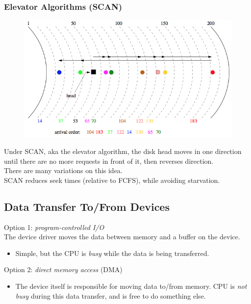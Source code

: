 \documentclass[12pt]{article}
\theoremstyle{plain}
\theoremstyle{definition}
\begin{document}
\subsubsection{Elevator Algorithms (SCAN)}
\begin{figure}[H]
  \centering
  \includegraphics[scale=0.5]{pictures/scan_disk.png}
\end{figure}
Under SCAN, aka the elevator algorithm, the disk head moves in one direction until there are no more requests in front of it, then reverses direction. \\
There are many variations on this idea. \\

SCAN reduces seek times (relative to FCFS), while avoiding starvation.

\subsection{Data Transfer To/From Devices}
Option 1: \emph{program-controlled I/O} \\
The device driver moves the data between memory and a buffer on the device.
\begin{itemize}
  \item Simple, but the CPU is \emph{busy} while the data is being transferred.
\end{itemize}
\medskip
Option 2: \emph{direct memory access} (DMA)
\begin{itemize}
  \item The device itself is responsible for moving data to/from memory.
  CPU is \emph{not busy} during this data transfer, and is free to do something else.
\end{itemize}
\end{document}
